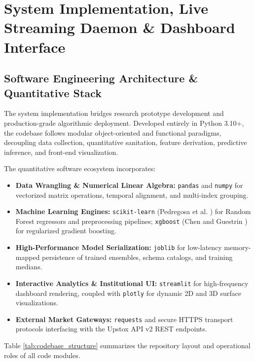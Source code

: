 \chapter{System Implementation, Live Streaming Daemon \& Dashboard Interface}
\label{chap:implementation}

\section{Software Engineering Architecture \& Quantitative Stack}
\label{sec:software_stack}

The system implementation bridges research prototype development and production-grade algorithmic deployment. Developed entirely in Python 3.10+, the codebase follows modular object-oriented and functional paradigms, decoupling data collection, quantitative sanitation, feature derivation, predictive inference, and front-end visualization.

The quantitative software ecosystem incorporates:
\begin{itemize}
    \item \textbf{Data Wrangling \& Numerical Linear Algebra:} \texttt{pandas} and \texttt{numpy} for vectorized matrix operations, temporal alignment, and multi-index grouping.
    \item \textbf{Machine Learning Engines:} \texttt{scikit-learn} (Pedregosa et al. \cite{pedregosa2011scikit}) for Random Forest regressors and preprocessing pipelines; \texttt{xgboost} (Chen and Guestrin \cite{chen2016xgboost}) for regularized gradient boosting.
    \item \textbf{High-Performance Model Serialization:} \texttt{joblib} for low-latency memory-mapped persistence of trained ensembles, schema catalogs, and training medians.
    \item \textbf{Interactive Analytics \& Institutional UI:} \texttt{streamlit} for high-frequency dashboard rendering, coupled with \texttt{plotly} for dynamic 2D and 3D surface visualizations.
    \item \textbf{External Market Gateways:} \texttt{requests} and secure HTTPS transport protocols interfacing with the Upstox API v2 REST endpoints.
\end{itemize}

Table \ref{tab:codebase_structure} summarizes the repository layout and operational roles of all code modules.

